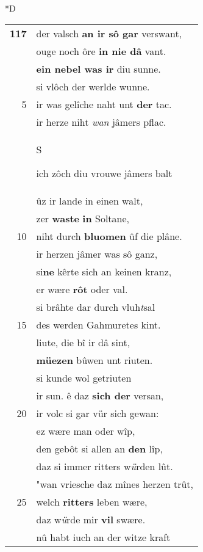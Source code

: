 \documentclass[8pt,a4paper,notitlepage]{article}
\begin{document}
\begin{table}[ht]
\begin{minipage}[t]{0.5\linewidth}
\small
\begin{center}*D
\end{center}
\begin{tabular}{rl}
\textbf{117} & der valsch \textbf{an ir sô gar} verswant,\\ 
 & ouge noch ôre \textbf{in nie dâ} vant.\\ 
 & \textbf{ein nebel was ir} diu sunne.\\ 
 & si vlôch der werlde wunne.\\ 
5 & ir was gelîche naht unt \textbf{der} tac.\\ 
 & ir herze niht \textit{wan} jâmers pflac.\\ 
 & \begin{large}S\end{large}ich zôch diu vrouwe jâmers balt\\ 
 & ûz ir lande in einen walt,\\ 
 & zer \textbf{waste} \textbf{in} Soltane,\\ 
10 & niht durch \textbf{bluomen} ûf die plâne.\\ 
 & ir herzen jâmer was sô ganz,\\ 
 & si\textbf{ne} kêrte sich an keinen kranz,\\ 
 & er wære \textbf{rôt} oder val.\\ 
 & si brâhte dar durch vluh\textit{t}sal\\ 
15 & des werden Gahmuretes kint.\\ 
 & liute, die bî ir dâ sint,\\ 
 & \textbf{müezen} bûwen unt riuten.\\ 
 & si kunde wol getriuten\\ 
 & ir sun. ê daz \textbf{sich der} versan,\\ 
20 & ir volc si gar vür sich gewan:\\ 
 & ez wære man oder wîp,\\ 
 & den gebôt si allen an \textbf{den} lîp,\\ 
 & daz si immer ritters w\textit{ü}rden lût.\\ 
 & "wan vriesche daz mînes herzen trût,\\ 
25 & welch \textbf{ritters} leben wære,\\ 
 & daz w\textit{ü}rde mir \textbf{vil} swære.\\ 
 & nû habt iuch an der witze kraft\\ 

\end{tabular}
\end{minipage}
\end{table}
\end{document}
